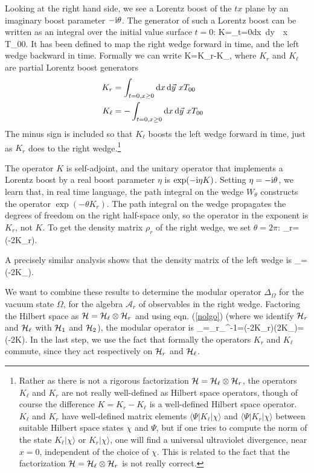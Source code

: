 \documentclass[12pt]{article}
\def\ra{\rangle}
\def\la{\langle}
\numberwithin{equation}{section}
\def\d{\mathrm d}
\def\A{{\mathcal A}}
\begin{document}
 Looking at the right hand side, we see a Lorentz boost of the $tx$ plane by an imaginary boost parameter $-{\mathrm i}\theta$.  The generator
 of such a Lorentz boost can be written as an integral over the initial value surface $t=0$:
 \be\label{yett} K=\int_{t=0}\d x \,\d\vec y \,\, x\,T_{00}. \ee
 It has been defined to map the right wedge forward in time, and the left wedge backward in time. 
  Formally we can write
 \be\label{plett} K=K_r-K_\ell,\ee
 where $K_r$ and $K_\ell$ are partial Lorentz boost generators
 \begin{align}\label{zone} K_r & =\int_{t=0,x\geq 0}\d x\,\d\vec y \,\,xT_{00}\cr 
                                         K_\ell & =-\int_{t=0,x\geq 0}\d x\,\d\vec y \,\,xT_{00}\cr \end{align}
 The minus sign is included so that $K_\ell$ boosts the left wedge forward in time, just as $K_r$ does to the right wedge.\footnote{Rather
 as there is not a rigorous factorization ${\mathcal H}={\mathcal H}_\ell\otimes {\mathcal H}_r$,  the operators $K_\ell$ and $K_r$ are not really well-defined as
 Hilbert space operators, though of course the difference $K=K_r-K_\ell$ is a well-defined Hilbert space operator.  $K_\ell$ and
 $K_r$ have well-defined matrix elements $\la\Psi | K_\ell|\chi\ra$ and $\la\Psi|K_r|\chi\ra$ between suitable Hilbert space
 states $\chi$ and $\Psi$, but if one tries to compute the norm of the state $K_\ell|\chi\ra$ or $K_r|\chi\ra$, one will find
 a universal ultraviolet divergence, near $x=0$, independent of the choice of $\chi$.  This is related to the fact that the factorization
 ${\mathcal H}={\mathcal H}_\ell\otimes {\mathcal H}_r$ is not really correct.}                                         
                                         
 The operator $K$ is self-adjoint, and the unitary operator that implements a Lorentz boost  by a real boost parameter $\eta$
 is $\exp(-{\mathrm i}\eta K)$.  Setting $\eta = -{\mathrm i}\theta$, we learn that, in real time language, the path integral on the wedge $W_\theta$
 constructs the operator $\exp(-\theta K_r)$.  
The path integral on the wedge propagates the degrees of freedom on the right half-space only, so the operator in the exponent
is $K_r$, not $K$. 
  To get the density matrix $\rho_r$ of the right wedge, we set $\theta=2\pi$:
 \be\label{poko} \rho_r=\exp(-2\pi K_r). \ee
 
 A precisely similar analysis shows that the density matrix of the left wedge is
 \be\label{noko}\rho_\ell=\exp(-2\pi K_\ell). \ee
 
 We want to combine these results to determine the modular operator $\Delta_\Omega$ for the vacuum state $\Omega$,
 for the algebra $\A_r$ of observables in the right wedge.  Factoring the Hilbert space as ${\mathcal H}={\mathcal H}_\ell\otimes {\mathcal H}_r$
 and using eqn. (\ref{nolgo}) (where we identify ${\mathcal H}_r$ and ${\mathcal H}_\ell$ with ${\mathcal H}_1$ and ${\mathcal H}_2$), the modular operator is
 \be\label{polgox} \Delta_\Omega=\rho_r\otimes \rho_\ell^{-1}=\exp(-2\pi K_r)\exp(2\pi K_\ell)=\exp(-2\pi K).  \ee
 In the last step, we use the fact that formally
 the operators $K_r$ and $K_\ell$ commute, since they act respectively on ${\mathcal H}_r$ and ${\mathcal H}_\ell$.
 
\end{document}
